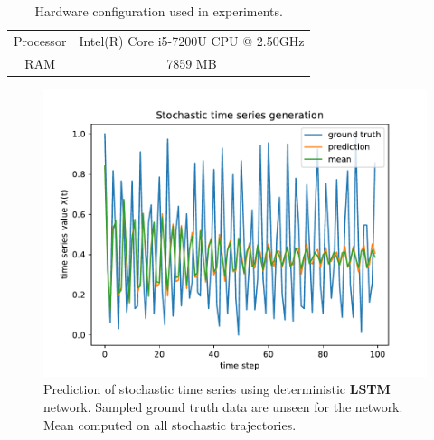 \documentclass{article}
\begin{document}
\begin{table}
    \centering
    \begin{tabular}{cc}
        Processor & Intel(R) Core i5-7200U CPU @ 2.50GHz \\
        RAM       & 7859 MB                              \\
    \end{tabular}
    \caption{Hardware configuration used in experiments.}
    \label{tab:hardware}
\end{table}

\begin{figure}
    \centering
    \includegraphics[width=\textwidth]{figures/nn_limitation.pdf}
    \caption{Prediction of stochastic time series using deterministic
        \textbf{LSTM} network. Sampled ground truth data are unseen for the network.
        Mean computed on all stochastic trajectories.}
    \label{fig:nn_limitation}
\end{figure}





\end{document}
